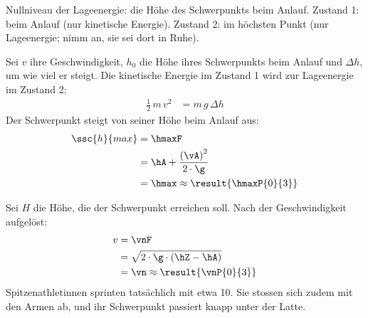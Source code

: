 Nullniveau der Lageenergie: die Höhe des Schwerpunkts beim Anlauf. Zustand 1: beim Anlauf (nur kinetische Energie). Zustand 2: im höchsten Punkt (nur Lageenergie; nimm an, sie sei dort in Ruhe).

\begin{abcliste}
\abc
Sei $v$ ihre Geschwindigkeit, $h_0$ die Höhe ihres Schwerpunkts beim Anlauf und $\Delta h$, um wie viel er steigt. Die kinetische Energie im Zustand 1 wird zur Lageenergie im Zustand 2:
\begin{align}
 \frac{1}{2}\,m\,v^2 &= m\,g\,\Delta h
\end{align}
Der Schwerpunkt steigt von seiner Höhe beim Anlauf aus:
\begin{align}
 \ssc{h}{max} &= \hmaxF \\
   &= \hA+\frac{\left(\vA\right)^2}{2\cdot\g} \\
   &= \hmax \approx \result{\hmaxP{0}{3}}
\end{align}

\abc
Sei $H$ die Höhe, die der Schwerpunkt erreichen soll. Nach der Geschwindigkeit aufgelöst:
\begin{align}
 v &= \vnF \\
   &= \sqrt{2\cdot\g\cdot(\hZ-\hA)} \\
   &= \vn \approx \result{\vnP{0}{3}}
\end{align}
Spitzenathletinnen sprinten tatsächlich mit etwa \SI{10}{\mps}. Sie stossen sich zudem mit den Armen ab, und ihr Schwerpunkt passiert knapp unter der Latte.
\end{abcliste}
